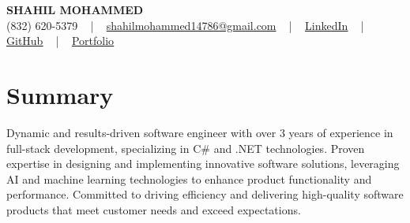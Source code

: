 \documentclass[letterpaper,10pt]{article}
\begin{document}
\begin{center}
    {\fontsize{14pt}{12pt}\selectfont \textbf{\MakeUppercase{Shahil Mohammed}}}\\ \vspace{2pt}
    \fontsize{10pt}{12pt}\selectfont (832) 620-5379 ~ | ~ \href{mailto:shahilmohammed14786@gmail.com}{shahilmohammed14786@gmail.com} ~ | ~  
    \href{https://www.linkedin.com/in/shahil-mohammed-9652931a1/}{\color{blue}\underline{LinkedIn}}  ~ | ~ 
    \href{https://github.com/freakbeast14}{\color{blue}\underline{GitHub}} ~ | ~ 
    \href{https://shahil-mohammed.netlify.app/}{\color{blue}\underline{Portfolio}}
    \vspace{-8pt}
\end{center}

\section{Summary}
\vspace{-2pt}\fontsize{8pt}{9pt}\selectfont
Dynamic and results-driven software engineer with over 3 years of experience in full-stack development, specializing in C# and .NET technologies. Proven expertise in designing and implementing innovative software solutions, leveraging AI and machine learning technologies to enhance product functionality and performance. Committed to driving efficiency and delivering high-quality software products that meet customer needs and exceed expectations. 
\vspace{-5pt}

\vspace{-2pt}
\end{document}
